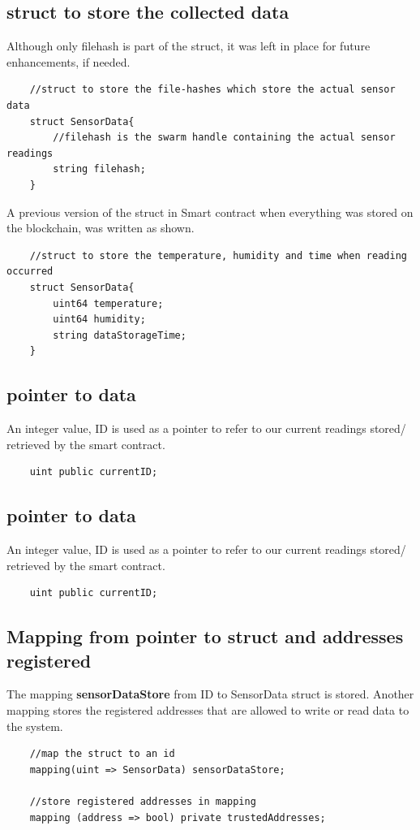 \documentclass[11pt,openright]{report}
\begin{document}
\subsection{struct to store the collected data}
Although only filehash is part of the struct, it was left in place for future enhancements, if needed.
\begin{verbatim}
    //struct to store the file-hashes which store the actual sensor data
    struct SensorData{
        //filehash is the swarm handle containing the actual sensor readings
        string filehash;
    }
\end{verbatim}

A previous version of the struct in Smart contract when everything was stored on the blockchain, was written as shown.

\begin{verbatim}
    //struct to store the temperature, humidity and time when reading occurred
    struct SensorData{
        uint64 temperature;
        uint64 humidity;
        string dataStorageTime;
    }
\end{verbatim}

\subsection{pointer to data}
An integer value, ID is used as a pointer to refer to our current readings stored/ retrieved by the smart contract.
\begin{verbatim}
    uint public currentID;
\end{verbatim}

\subsection{pointer to data}
An integer value, ID is used as a pointer to refer to our current readings stored/ retrieved by the smart contract.
\begin{verbatim}
    uint public currentID;
\end{verbatim}


 
\subsection{Mapping from pointer to struct and addresses registered}
The mapping \textbf{sensorDataStore} from ID to SensorData struct is stored. Another mapping stores the registered addresses that are allowed to write or read data to the system.
\begin{verbatim}
    //map the struct to an id
    mapping(uint => SensorData) sensorDataStore;

    //store registered addresses in mapping
    mapping (address => bool) private trustedAddresses;
\end{verbatim}
\end{document}
